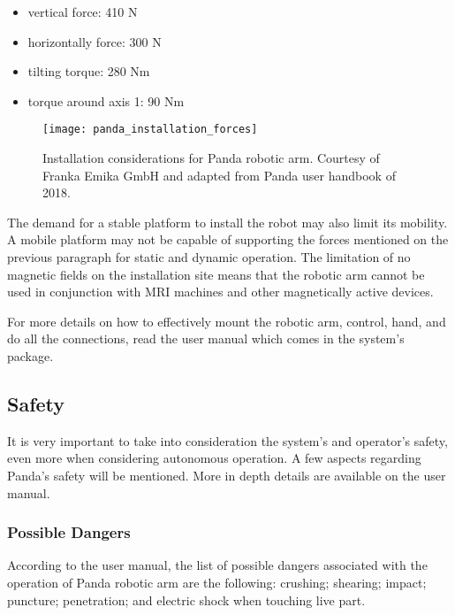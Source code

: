 \begin{itemize}
    \item vertical force: 410 N
    \item horizontally force: 300 N
    \item tilting torque: 280 Nm
    \item torque around axis 1: 90 Nm
\end{itemize}

\begin{figure}[htbp]
    \centering
	\texttt{[image: panda\_installation\_forces]}
	\caption[Installation considerations for Panda robotic arm.]{Installation considerations for Panda robotic arm. Courtesy of Franka Emika GmbH and adapted from Panda user handbook of 2018.}
	\label{fig:panda_installation_forces}
\end{figure}

The demand for a stable platform to install the robot may also limit its mobility. A mobile platform may not be capable of supporting the forces mentioned on the previous paragraph for static and dynamic operation. The limitation of no magnetic fields on the installation site means that the robotic arm cannot be used in conjunction with MRI machines and other magnetically active devices.

For more details on how to effectively mount the robotic arm, control, hand, and do all the connections, read the user manual which comes in the system's package.


\subsection{Safety}
\label{subsec:robotic_system_operation_safety}

It is very important to take into consideration the system's and operator's safety, even more when considering autonomous operation. A few aspects regarding Panda's safety will be mentioned. More in depth details are available on the user manual.

\subsubsection*{Possible Dangers}
\label{subsubsec:robotic_system_operation_safety_possible_dangers}

According to the user manual, the list of possible dangers associated with the operation of Panda robotic arm are the following: crushing; shearing; impact; puncture; penetration; and electric shock when touching live part.

